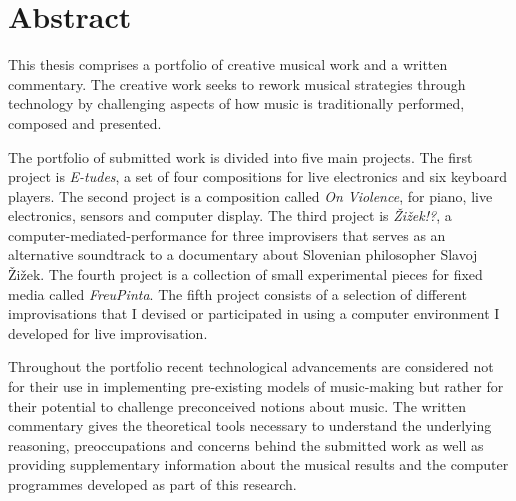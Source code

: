 \chapter*{Abstract}

This thesis comprises a portfolio of creative musical work and a written commentary. The creative work seeks to rework musical strategies through technology by challenging aspects of how music is traditionally performed, composed and presented. 

The portfolio of submitted work is divided into five main projects. The first project is \emph{E-tudes}, a set of four compositions for live electronics and six keyboard players. The second project is a composition called \emph{On Violence}, for piano, live electronics, sensors and computer display. The third project is \emph{\v{Z}i\v{z}ek!?}, a computer-mediated-performance for three improvisers that serves as an alternative soundtrack to a documentary about Slovenian philosopher Slavoj \v{Z}i\v{z}ek. The fourth project is a collection of small experimental pieces for fixed media called \emph{FreuPinta}. The fifth project consists of a selection of different improvisations that I devised or participated in using a computer environment I developed for live improvisation. 

Throughout the portfolio recent technological advancements are considered not for their use in implementing pre-existing models of music-making but rather for their potential to challenge preconceived notions about music. The written commentary gives the theoretical tools necessary to understand the underlying reasoning, preoccupations and concerns behind the submitted work as well as providing supplementary information about the musical results and the computer programmes developed as part of this research.